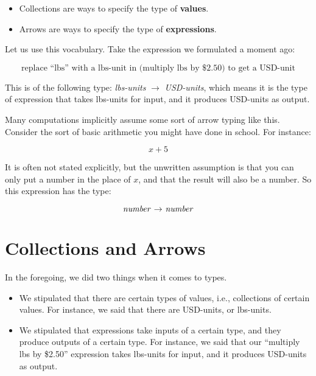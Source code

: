 \documentclass{book}
\numberwithin{equation}{chapter}
\newcommand{\vocab}{\textbf}
\begin{document}
\begin{itemize}
\item{Collections are ways to specify the type of \vocab{values}.} 
\item{Arrows are ways to specify the type of \vocab{expressions}.}
\end{itemize}

\noindent
Let us use this vocabulary. Take the expression we formulated a moment ago: 

\begin{equation}
\text{replace ``lbs'' with a lbs-unit in (multiply lbs by \$2.50) to get a USD-unit}
\end{equation}

\noindent
This is of the following type: \textit{lbs-units} $\rightarrow$ \textit{USD-units}, which means it is the type of expression that takes lbs-units for input, and it produces USD-units as output.

Many computations implicitly assume some sort of arrow typing like this. Consider the sort of basic arithmetic you might have done in school. For instance:

\begin{equation}
x + 5
\end{equation}

\noindent
It is often not stated explicitly, but the unwritten assumption is that you can only put a number in the place of $x$, and that the result will also be a number. So this expression has the type:

\begin{equation}
\text{\textit{number} $\rightarrow$ \textit{number}}
\end{equation}


\section{Collections and Arrows}

In the foregoing, we did two things when it comes to types. 

\begin{itemize}

\item{We stipulated that there are certain types of values, i.e., collections of certain values. For instance, we said that there are USD-units, or lbs-units.}

\item{We stipulated that expressions take inputs of a certain type, and they produce outputs of a certain type. For instance, we said that our ``multiply lbs by \$2.50'' expression takes lbs-units for input, and it produces USD-units as output.}

\end{itemize}
\end{document}
